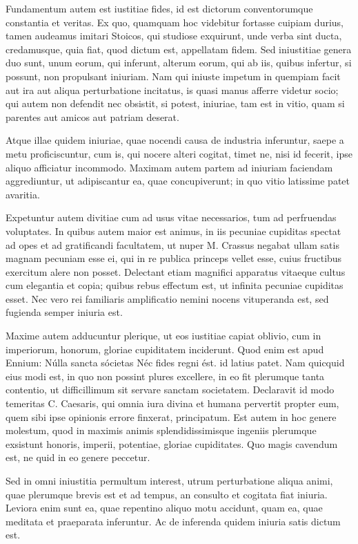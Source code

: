  Fundamentum autem est iustitiae fides, id est dictorum conventorumque constantia et veritas. Ex quo, quamquam hoc videbitur fortasse cuipiam durius, tamen audeamus imitari Stoicos, qui studiose exquirunt, unde verba sint ducta, credamusque, quia fiat, quod dictum est, appellatam fidem. Sed iniustitiae genera duo sunt, unum eorum, qui inferunt, alterum eorum, qui ab iis, quibus infertur, si possunt, non propulsant iniuriam. Nam qui iniuste impetum in quempiam facit aut ira aut aliqua perturbatione incitatus, is quasi manus afferre videtur socio; qui autem non defendit nec obsistit, si potest, iniuriae, tam est in vitio, quam si parentes aut amicos aut patriam deserat.

 Atque illae quidem iniuriae, quae nocendi causa de industria inferuntur, saepe a metu proficiscuntur, cum is, qui nocere alteri cogitat, timet ne, nisi id fecerit, ipse aliquo afficiatur incommodo. Maximam autem partem ad iniuriam faciendam aggrediuntur, ut adipiscantur ea, quae concupiverunt; in quo vitio latissime patet avaritia.

 Expetuntur autem divitiae cum ad usus vitae necessarios, tum ad perfruendas voluptates. In quibus autem maior est animus, in iis pecuniae cupiditas spectat ad opes et ad gratificandi facultatem, ut nuper M. Crassus negabat ullam satis magnam pecuniam esse ei, qui in re publica princeps vellet esse, cuius fructibus exercitum alere non posset. Delectant etiam magnifici apparatus vitaeque cultus cum elegantia et copia; quibus rebus effectum est, ut infinita pecuniae cupiditas esset. Nec vero rei familiaris amplificatio nemini nocens vituperanda est, sed fugienda semper iniuria est.

 Maxime autem adducuntur plerique, ut eos iustitiae capiat oblivio, cum in imperiorum, honorum, gloriae cupiditatem inciderunt. Quod enim est apud Ennium: Núlla sancta sócietas Néc fides regni ést. id latius patet. Nam quicquid eius modi est, in quo non possint plures excellere, in eo fit plerumque tanta contentio, ut difficillimum sit servare sanctam societatem. Declaravit id modo temeritas C. Caesaris, qui omnia iura divina et humana pervertit propter eum, quem sibi ipse opinionis errore finxerat, principatum. Est autem in hoc genere molestum, quod in maximis animis splendidissimisque ingeniis plerumque exsistunt honoris, imperii, potentiae, gloriae cupiditates. Quo magis cavendum est, ne quid in eo genere peccetur.

 Sed in omni iniustitia permultum interest, utrum perturbatione aliqua animi, quae plerumque brevis est et ad tempus, an consulto et cogitata fiat iniuria. Leviora enim sunt ea, quae repentino aliquo motu accidunt, quam ea, quae meditata et praeparata inferuntur. Ac de inferenda quidem iniuria satis dictum est.

